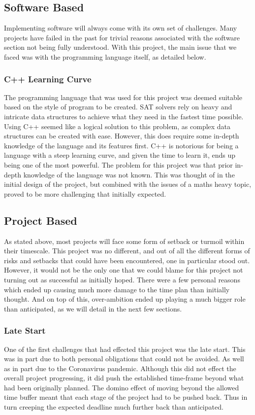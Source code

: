 \documentclass{article}
\begin{document}
\subsection{Software Based}
Implementing software will always come with its own set of challenges. Many projects have failed in the past for trivial reasons
associated with the software section not being fully understood. With this project, the main issue that we faced was with the
programming language itself, as detailed below.

\subsubsection{C++ Learning Curve}
The programming language that was used for this project was deemed suitable based on the style of program to be created. SAT
solvers rely on heavy and intricate data structures to achieve what they need in the fastest time possible. Using C++ seemed like
a logical solution to this problem, as complex data structures can be created with ease. However, this does require some in-depth
knowledge of the language and its features first. C++ is notorious for being a language with a steep learning curve, and given the
time to learn it, ends up being one of the most powerful. The problem for this project was that prior in-depth knowledge of the
language was not known. This was thought of in the initial design of the project, but combined with the issues of a maths heavy
topic, proved to be more challenging that initially expected.

\subsection{Project Based}
As stated above, most projects will face some form of setback or turmoil within their timescale. This project was no different,
and out of all the different forms of risks and setbacks that could have been encountered, one in particular stood out. However,
it would not be the only one that we could blame for this project not turning out as successful as initially hoped. There were a
few personal reasons which ended up causing much more damage to the time plan than initially thought. And on top of this,
over-ambition ended up playing a much bigger role than anticipated, as we will detail in the next few sections.

\subsubsection{Late Start}
One of the first challenges that had effected this project was the late start. This was in part due to both personal obligations
that could not be avoided. As well as in part due to the Coronavirus pandemic. Although this did not effect the overall project
progressing, it did push the established time-frame beyond what had been originally planned. The domino effect of moving beyond
the allowed time buffer meant that each stage of the project had to be pushed back. Thus in turn creeping the expected deadline
much further back than anticipated.
\end{document}

